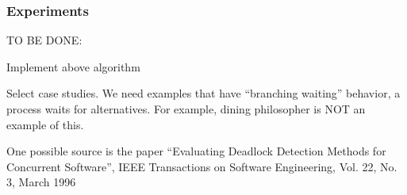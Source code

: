 \subsubsection{Experiments}

TO BE DONE:
\bn

\item Implement above algorithm

\item Select case studies. We need examples that have ``branching
waiting'' behavior, \ie a process waits for alternatives. For example,
dining philosopher is NOT an example of this. 

One possible source is the paper 
``Evaluating Deadlock Detection Methods for Concurrent Software'', 
IEEE Transactions on Software Engineering, Vol. 22, No. 3, March 1996

\en



